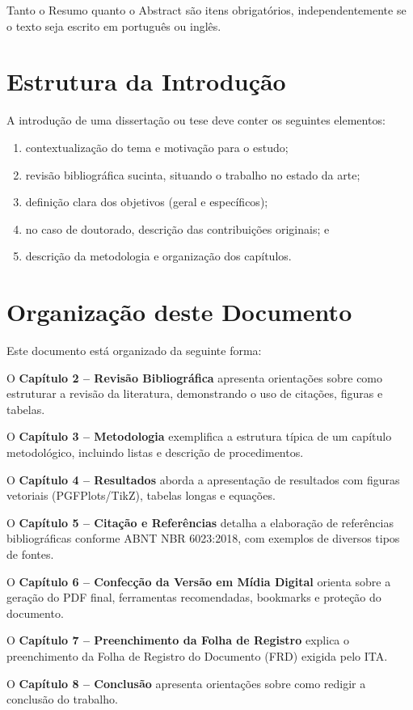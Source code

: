 Tanto o Resumo quanto o Abstract são itens obrigatórios, independentemente se o texto seja escrito em português ou inglês.

\section{Estrutura da Introdução}

A introdução de uma dissertação ou tese deve conter os seguintes elementos:

\begin{enumerate}
    \item contextualização do tema e motivação para o estudo;
    \item revisão bibliográfica sucinta, situando o trabalho no estado da arte;
    \item definição clara dos objetivos (geral e específicos);
    \item no caso de doutorado, descrição das contribuições originais; e
    \item descrição da metodologia e organização dos capítulos.
\end{enumerate}

\section{Organização deste Documento}

Este documento está organizado da seguinte forma:

O \textbf{Capítulo 2 -- Revisão Bibliográfica} apresenta orientações sobre como estruturar a revisão da literatura, demonstrando o uso de citações, figuras e tabelas.

O \textbf{Capítulo 3 -- Metodologia} exemplifica a estrutura típica de um capítulo metodológico, incluindo listas e descrição de procedimentos.

O \textbf{Capítulo 4 -- Resultados} aborda a apresentação de resultados com figuras vetoriais (PGFPlots/TikZ), tabelas longas e equações.

O \textbf{Capítulo 5 -- Citação e Referências} detalha a elaboração de referências bibliográficas conforme ABNT NBR 6023:2018, com exemplos de diversos tipos de fontes.

O \textbf{Capítulo 6 -- Confecção da Versão em Mídia Digital} orienta sobre a geração do PDF final, ferramentas recomendadas, bookmarks e proteção do documento.

O \textbf{Capítulo 7 -- Preenchimento da Folha de Registro} explica o preenchimento da Folha de Registro do Documento (FRD) exigida pelo \ac{ITA}.

O \textbf{Capítulo 8 -- Conclusão} apresenta orientações sobre como redigir a conclusão do trabalho.
